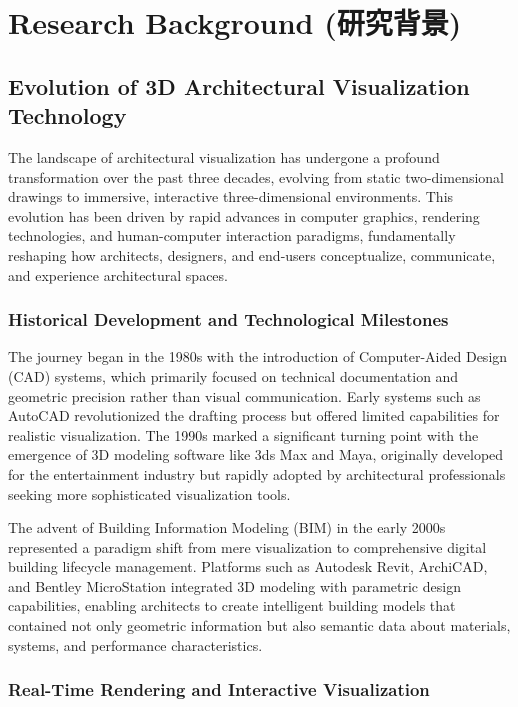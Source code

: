 \section{Research Background (研究背景)}
\label{sec:research_background}

\subsection{Evolution of 3D Architectural Visualization Technology}
\label{subsec:evolution_3d_visualization}

The landscape of architectural visualization has undergone a profound transformation over the past three decades, evolving from static two-dimensional drawings to immersive, interactive three-dimensional environments. This evolution has been driven by rapid advances in computer graphics, rendering technologies, and human-computer interaction paradigms, fundamentally reshaping how architects, designers, and end-users conceptualize, communicate, and experience architectural spaces.

\subsubsection{Historical Development and Technological Milestones}
\label{subsubsec:historical_development}

The journey began in the 1980s with the introduction of Computer-Aided Design (CAD) systems, which primarily focused on technical documentation and geometric precision rather than visual communication. Early systems such as AutoCAD revolutionized the drafting process but offered limited capabilities for realistic visualization. The 1990s marked a significant turning point with the emergence of 3D modeling software like 3ds Max and Maya, originally developed for the entertainment industry but rapidly adopted by architectural professionals seeking more sophisticated visualization tools.

The advent of Building Information Modeling (BIM) in the early 2000s represented a paradigm shift from mere visualization to comprehensive digital building lifecycle management. Platforms such as Autodesk Revit, ArchiCAD, and Bentley MicroStation integrated 3D modeling with parametric design capabilities, enabling architects to create intelligent building models that contained not only geometric information but also semantic data about materials, systems, and performance characteristics.

\subsubsection{Real-Time Rendering and Interactive Visualization}
\label{subsubsec:realtime_rendering}

